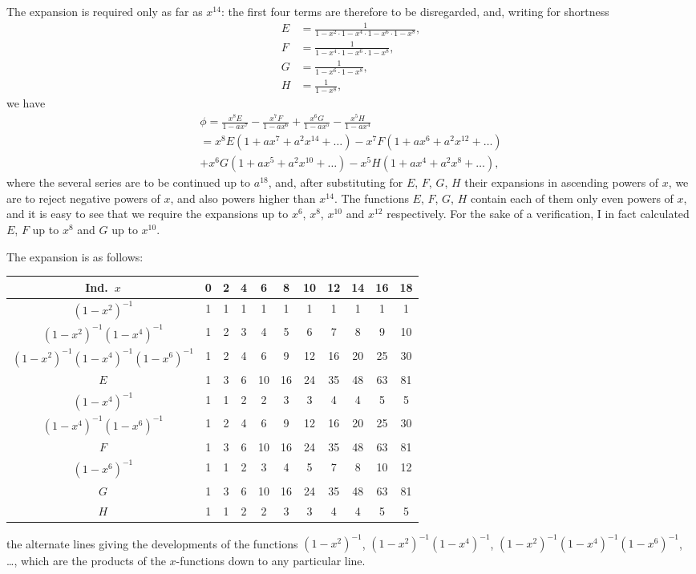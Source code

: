 \documentclass[11pt,a4paper]{article}
\begin{document}
\clearpage
The expansion is required only as far as $x^{14}$: the first four terms are therefore to be disregarded, and, writing for shortness
\begin{align*}
E &= \frac{1}{1 - x^2 \cdot 1 - x^4 \cdot 1 - x^6 \cdot 1 - x^8}, \\
F &= \frac{1}{1 - x^4 \cdot 1 - x^6 \cdot 1 - x^8}, \\
G &= \frac{1}{1 - x^6 \cdot 1 - x^8}, \\
H &= \frac{1}{1 - x^8},
\end{align*}
we have
\begin{multline*}
\phi = \frac{x^8E}{1 - ax^7} - \frac{x^7F}{1 - ax^6} + \frac{x^6G}{1 - ax^5} - \frac{x^5H}{1 - ax^4} \\
= x^8E(1 + ax^7 + a^2x^{14} + \dots) - x^7F(1 + ax^6 + a^2x^{12} + \dots) \\
+ x^6G(1 + ax^5 + a^2x^{10} + \dots) - x^5H(1 + ax^4 + a^2x^8 + \dots),
\end{multline*}
where the several series are to be continued up to $a^{18}$, and, after substituting for $E$, $F$, $G$, $H$ their expansions in ascending powers of $x$, we are to reject negative powers of $x$, and also powers higher than $x^{14}$. The functions $E$, $F$, $G$, $H$ contain each of them only even powers of $x$, and it is easy to see that we require the expansions up to $x^6$, $x^8$, $x^{10}$ and $x^{12}$ respectively. For the sake of a verification, I in fact calculated $E$, $F$ up to $x^8$ and $G$ up to $x^{10}$.

\clearpage
The expansion is as follows:

\begin{center}
\begin{tabular}{c|cccccccccc}
Ind.\ $x$ & 0 & 2 & 4 & 6 & 8 & 10 & 12 & 14 & 16 & 18 \\
\hline
$(1 - x^2)^{-1}$ & 1 & 1 & 1 & 1 & 1 & 1 & 1 & 1 & 1 & 1 \\
$(1 - x^2)^{-1}(1 - x^4)^{-1}$ & 1 & 2 & 3 & 4 & 5 & 6 & 7 & 8 & 9 & 10 \\
$(1 - x^2)^{-1}(1 - x^4)^{-1}(1 - x^6)^{-1}$ & 1 & 2 & 4 & 6 & 9 & 12 & 16 & 20 & 25 & 30 \\
$E$ & 1 & 3 & 6 & 10 & 16 & 24 & 35 & 48 & 63 & 81 \\
$(1 - x^4)^{-1}$ & 1 & 1 & 2 & 2 & 3 & 3 & 4 & 4 & 5 & 5 \\
$(1 - x^4)^{-1}(1 - x^6)^{-1}$ & 1 & 2 & 4 & 6 & 9 & 12 & 16 & 20 & 25 & 30 \\
$F$ & 1 & 3 & 6 & 10 & 16 & 24 & 35 & 48 & 63 & 81 \\
$(1 - x^6)^{-1}$ & 1 & 1 & 2 & 3 & 4 & 5 & 7 & 8 & 10 & 12 \\
$G$ & 1 & 3 & 6 & 10 & 16 & 24 & 35 & 48 & 63 & 81 \\
$H$ & 1 & 1 & 2 & 2 & 3 & 3 & 4 & 4 & 5 & 5
\end{tabular}
\end{center}
the alternate lines giving the developments of the functions $(1 - x^2)^{-1}$, $(1 - x^2)^{-1}(1 - x^4)^{-1}$, $(1 - x^2)^{-1}(1 - x^4)^{-1}(1 - x^6)^{-1}$, \dots, which are the products of the $x$-functions down to any particular line.
\end{document}
